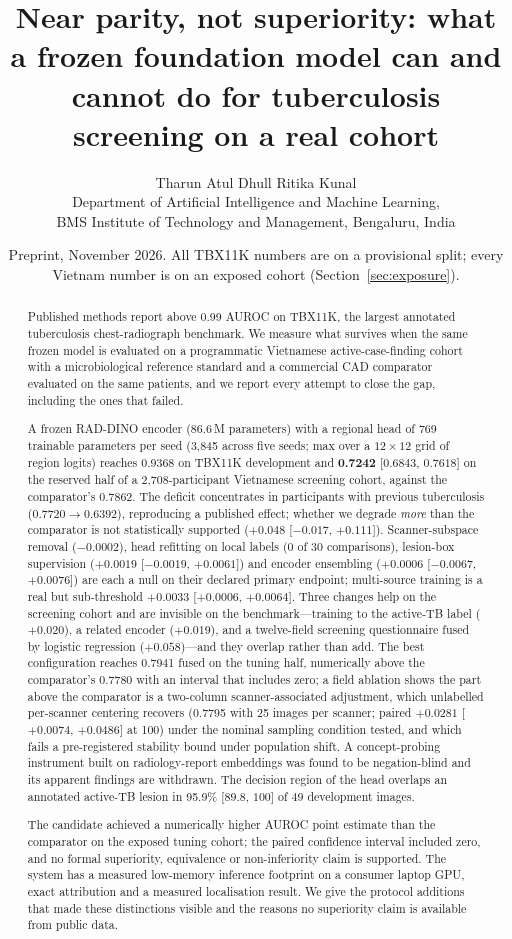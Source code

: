 \documentclass[11pt,a4paper]{article}
\title{\textbf{Near parity, not superiority: what a frozen foundation model can and cannot do for tuberculosis screening on a real cohort}}
\author{Tharun \quad Atul Dhull \quad Ritika \quad Kunal\\[0.4em]
\normalsize Department of Artificial Intelligence and Machine Learning,\\
\normalsize BMS Institute of Technology and Management, Bengaluru, India}
\date{\small Preprint, November 2026. All TBX11K numbers are on a provisional split; every Vietnam number is on an exposed cohort (Section~\ref{sec:exposure}).}
\newcommand{\ci}[2]{[$#1$, $#2$]}
\begin{document}
\maketitle

\begin{abstract}
Published methods report above 0.99 AUROC on TBX11K, the largest annotated tuberculosis chest-radiograph benchmark. We measure what survives when the same frozen model is evaluated on a programmatic Vietnamese active-case-finding cohort with a microbiological reference standard and a commercial CAD comparator evaluated on the same patients, and we report every attempt to close the gap, including the ones that failed.

A frozen RAD-DINO encoder (86.6\,M parameters) with a regional head of 769 trainable parameters per seed (3,845 across five seeds; max over a $12\times12$ grid of region logits) reaches 0.9368 on TBX11K development and \textbf{0.7242} \ci{0.6843}{0.7618} on the reserved half of a 2,708-participant Vietnamese screening cohort, against the comparator's 0.7862. The deficit concentrates in participants with previous tuberculosis ($0.7720 \rightarrow 0.6392$), reproducing a published effect; whether we degrade \emph{more} than the comparator is not statistically supported ($+0.048$ \ci{-0.017}{+0.111}). Scanner-subspace removal ($-0.0002$), head refitting on local labels (0 of 30 comparisons), lesion-box supervision ($+0.0019$ \ci{-0.0019}{+0.0061}) and encoder ensembling ($+0.0006$ \ci{-0.0067}{+0.0076}) are each a null on their declared primary endpoint; multi-source training is a real but sub-threshold $+0.0033$ \ci{+0.0006}{+0.0064}. Three changes help on the screening cohort and are invisible on the benchmark---training to the active-TB label ($+0.020$), a related encoder ($+0.019$), and a twelve-field screening questionnaire fused by logistic regression ($+0.058$)---and they overlap rather than add. The best configuration reaches 0.7941 fused on the tuning half, numerically above the comparator's 0.7780 with an interval that includes zero; a field ablation shows the part above the comparator is a two-column scanner-associated adjustment, which unlabelled per-scanner centering recovers (0.7795 with 25 images per scanner; paired $+0.0281$ \ci{+0.0074}{+0.0486} at 100) under the nominal sampling condition tested, and which fails a pre-registered stability bound under population shift. A concept-probing instrument built on radiology-report embeddings was found to be negation-blind and its apparent findings are withdrawn. The decision region of the head overlaps an annotated active-TB lesion in 95.9\% \ci{89.8}{100} of 49 development images.

The candidate achieved a numerically higher AUROC point estimate than the comparator on the exposed tuning cohort; the paired confidence interval included zero, and no formal superiority, equivalence or non-inferiority claim is supported. The system has a measured low-memory inference footprint on a consumer laptop GPU, exact attribution and a measured localisation result. We give the protocol additions that made these distinctions visible and the reasons no superiority claim is available from public data.
\end{abstract}
\end{document}
